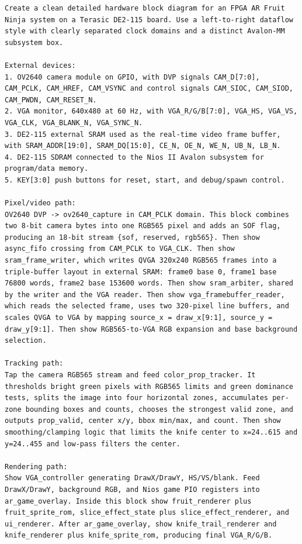 \documentclass[10pt]{article}
\begin{document}
\begin{lstlisting}
Create a clean detailed hardware block diagram for an FPGA AR Fruit Ninja system on a Terasic DE2-115 board. Use a left-to-right dataflow style with clearly separated clock domains and a distinct Avalon-MM subsystem box.

External devices:
1. OV2640 camera module on GPIO, with DVP signals CAM_D[7:0], CAM_PCLK, CAM_HREF, CAM_VSYNC and control signals CAM_SIOC, CAM_SIOD, CAM_PWDN, CAM_RESET_N.
2. VGA monitor, 640x480 at 60 Hz, with VGA_R/G/B[7:0], VGA_HS, VGA_VS, VGA_CLK, VGA_BLANK_N, VGA_SYNC_N.
3. DE2-115 external SRAM used as the real-time video frame buffer, with SRAM_ADDR[19:0], SRAM_DQ[15:0], CE_N, OE_N, WE_N, UB_N, LB_N.
4. DE2-115 SDRAM connected to the Nios II Avalon subsystem for program/data memory.
5. KEY[3:0] push buttons for reset, start, and debug/spawn control.

Pixel/video path:
OV2640 DVP -> ov2640_capture in CAM_PCLK domain. This block combines two 8-bit camera bytes into one RGB565 pixel and adds an SOF flag, producing an 18-bit stream {sof, reserved, rgb565}. Then show async_fifo crossing from CAM_PCLK to VGA_CLK. Then show sram_frame_writer, which writes QVGA 320x240 RGB565 frames into a triple-buffer layout in external SRAM: frame0 base 0, frame1 base 76800 words, frame2 base 153600 words. Then show sram_arbiter, shared by the writer and the VGA reader. Then show vga_framebuffer_reader, which reads the selected frame, uses two 320-pixel line buffers, and scales QVGA to VGA by mapping source_x = draw_x[9:1], source_y = draw_y[9:1]. Then show RGB565-to-VGA RGB expansion and base background selection.

Tracking path:
Tap the camera RGB565 stream and feed color_prop_tracker. It thresholds bright green pixels with RGB565 limits and green dominance tests, splits the image into four horizontal zones, accumulates per-zone bounding boxes and counts, chooses the strongest valid zone, and outputs prop_valid, center x/y, bbox min/max, and count. Then show smoothing/clamping logic that limits the knife center to x=24..615 and y=24..455 and low-pass filters the center.

Rendering path:
Show VGA_controller generating DrawX/DrawY, HS/VS/blank. Feed DrawX/DrawY, background RGB, and Nios game PIO registers into ar_game_overlay. Inside this block show fruit_renderer plus fruit_sprite_rom, slice_effect_state plus slice_effect_renderer, and ui_renderer. After ar_game_overlay, show knife_trail_renderer and knife_renderer plus knife_sprite_rom, producing final VGA_R/G/B.


\end{lstlisting}
\end{document}
